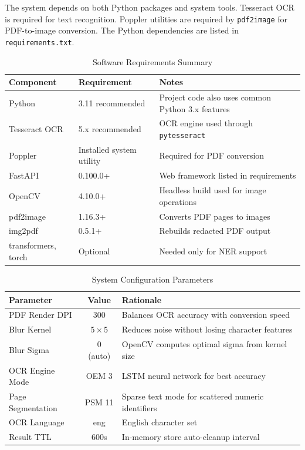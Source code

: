 The system depends on both Python packages and system tools. Tesseract OCR is required for text recognition. Poppler utilities are required by \texttt{pdf2image} for PDF-to-image conversion. The Python dependencies are listed in \texttt{requirements.txt}.

\begin{table}[htbp]
\caption{Software Requirements Summary}
\label{tab:sw_requirements}
\centering
\begin{tabular}{|l|l|l|}
\hline
\textbf{Component} & \textbf{Requirement} & \textbf{Notes} \\
\hline
Python & 3.11 recommended & Project code also uses common Python 3.x features \\
\hline
Tesseract OCR & 5.x recommended & OCR engine used through \texttt{pytesseract} \\
\hline
Poppler & Installed system utility & Required for PDF conversion \\
\hline
FastAPI & 0.100.0+ & Web framework listed in requirements \\
\hline
OpenCV & 4.10.0+ & Headless build used for image operations \\
\hline
pdf2image & 1.16.3+ & Converts PDF pages to images \\
\hline
img2pdf & 0.5.1+ & Rebuilds redacted PDF output \\
\hline
transformers, torch & Optional & Needed only for NER support \\
\hline
\end{tabular}
\end{table}

\begin{table}[htbp]
\caption{System Configuration Parameters}
\label{tab:config_params}
\centering
\begin{tabular}{|l|c|l|}
\hline
\textbf{Parameter} & \textbf{Value} & \textbf{Rationale} \\
\hline
PDF Render DPI & 300 & Balances OCR accuracy with conversion speed \\
\hline
Blur Kernel & $5 \times 5$ & Reduces noise without losing character features \\
\hline
Blur Sigma & 0 (auto) & OpenCV computes optimal sigma from kernel size \\
\hline
OCR Engine Mode & OEM 3 & LSTM neural network for best accuracy \\
\hline
Page Segmentation & PSM 11 & Sparse text mode for scattered numeric identifiers \\
\hline
OCR Language & eng & English character set \\
\hline
Result TTL & 600s & In-memory store auto-cleanup interval \\
\hline
\end{tabular}
\end{table}

